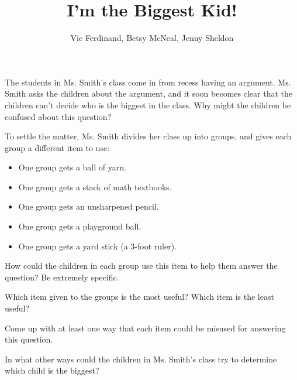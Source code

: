 \documentclass[nooutcomes]{ximera}
\title{I'm the Biggest Kid!}
\author{Vic Ferdinand, Betsy McNeal, Jenny Sheldon}
\begin{document}
\begin{abstract}\end{abstract}
\maketitle



\begin{problem}
    The students in Ms. Smith's class come in from recess having an argument.  Ms. Smith asks the children about the argument, and it soon becomes clear that the children can't decide who is the biggest in the class.  Why might the children be confused about this question?
\end{problem}


\begin{problem} \label{BiggestKid2}
    To settle the matter, Ms. Smith divides her class up into groups, and gives each group a different item to use:
    \begin{itemize}
        \item One group gets a ball of yarn.
        \item One group gets a stack of math textbooks.
        \item One group gets an unsharpened pencil.
        \item One group gets a playground ball.
        \item One group gets a yard stick (a 3-foot ruler).
    \end{itemize}
    
    How could the children in each group use this item to help them answer the question?  Be extremely specific.
\end{problem}

\begin{problem} \label{BiggestKid3}
    Which item given to the groups is the most useful?  Which item is the least useful?
    
    Come up with at least one way that each item could be misused for answering this question.
\end{problem}

\begin{problem}
    In what other ways could the children in Ms. Smith's class try to determine which child is the biggest?
\end{problem}


\newpage
\end{document}
